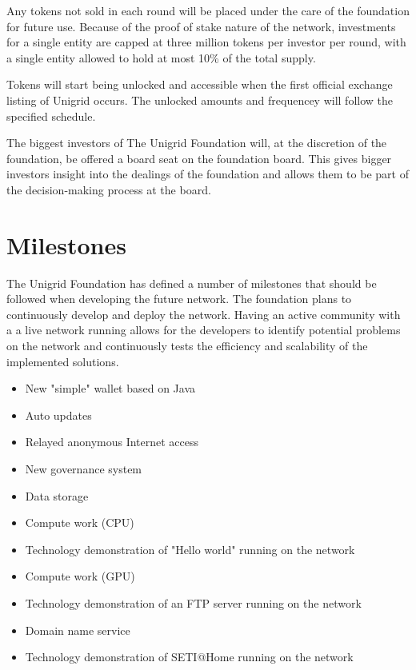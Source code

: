 \documentclass{article}
\begin{document}
\vspace{0.6cm}
\noindent Any tokens not sold in each round will be placed under the care of the foundation for future use. Because of the proof of stake nature of the  network, investments for a single entity are capped at three million tokens per investor per round, with a single entity allowed to hold at most 10\% of the total supply.

\noindent Tokens will start being unlocked and accessible when the first official exchange listing of Unigrid occurs. The unlocked amounts and frequencey will follow the specified schedule.

The biggest investors of The Unigrid Foundation will, at the discretion of the foundation, be offered a board seat on the foundation board. This gives bigger investors insight into the dealings of the foundation and allows them to be part of the decision-making process at the board.

\section{Milestones}
The Unigrid Foundation has defined a number of milestones that should be followed when developing the future network. The foundation plans to continuously develop and deploy the network. Having an active community with a a live network running allows for the developers to identify potential problems on the network and continuously tests the efficiency and scalability of the implemented solutions.

\begin{itemize}
  \item New "simple" wallet based on Java
  \item Auto updates
  \item Relayed anonymous Internet access
  \item New governance system
  \item Data storage
  \item Compute work (CPU)
  \item Technology demonstration of "Hello world" running on the network
  \item Compute work (GPU)
  \item Technology demonstration of an FTP server running on the network
  \item Domain name service
  \item Technology demonstration of SETI@Home running on the network
\end{itemize}
\end{document}
